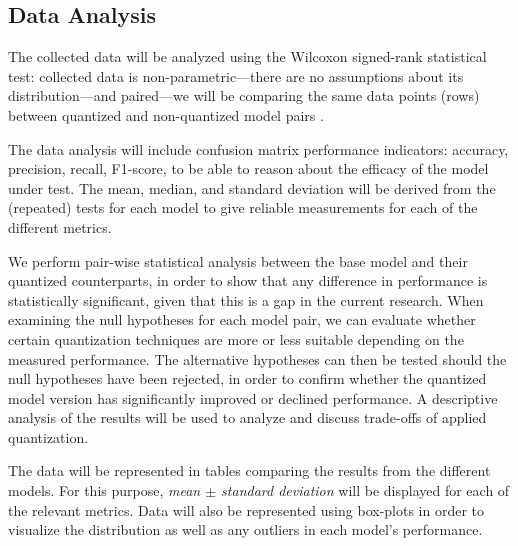\documentclass[conference]{IEEEtran}
\begin{document}
\subsection{Data Analysis}


The collected data will be analyzed using the Wilcoxon signed-rank statistical
test: collected data is non-parametric---there are no assumptions about its
distribution---and paired---we will be comparing the same data points
(rows) between quantized and non-quantized model pairs
\cite{wohlin2012experimentation}. %

The data analysis will include confusion matrix performance indicators:
accuracy, precision, recall, F1-score, to be able to reason about the efficacy
of the model under test. The mean, median, and standard deviation will be
derived from the (repeated) tests for each model to give reliable measurements for
each of the different metrics. 

We perform pair-wise statistical analysis between the base model and their quantized counterparts, in order to show that any difference in performance is statistically significant, given that this is a gap in the current research. When examining the null hypotheses for each model pair, we can evaluate whether certain quantization techniques are more or less suitable depending on the measured performance. The alternative hypotheses can then be tested should the null hypotheses have been rejected, in order to confirm whether the quantized model version has significantly improved or declined performance. A descriptive analysis of the results will be used to analyze and discuss trade-offs of applied quantization. 

The data will be represented in tables comparing
the results from the different models. For this purpose, \textit{mean $\pm$ standard
deviation} will be displayed for each of the relevant metrics. Data will also be
represented using box-plots in order to visualize the distribution as well as
any outliers in each model's performance. 
\end{document}
